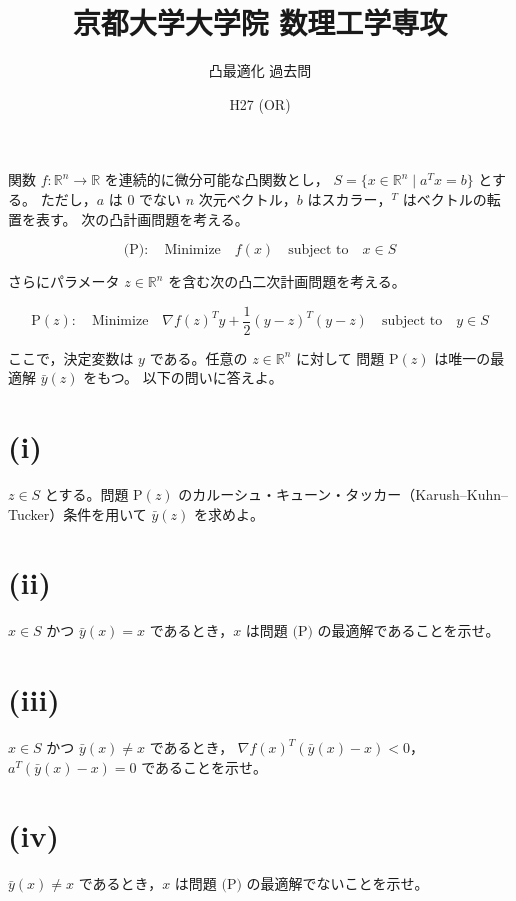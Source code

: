\documentclass[12pt,a4paper]{article}
\title{京都大学大学院 数理工学専攻}
\author{凸最適化 過去問}
\date{H27 (OR)}
\begin{document}
\maketitle

関数 $f:\mathbb{R}^n \to \mathbb{R}$ を連続的に微分可能な凸関数とし，
$S=\{x\in\mathbb{R}^n\mid a^T x=b\}$ とする。
ただし，$a$ は $0$ でない $n$ 次元ベクトル，$b$ はスカラー，$^T$ はベクトルの転置を表す。
次の凸計画問題を考える。

\[
\text{(P)}:\quad\text{Minimize}\quad f(x)\quad
\text{subject to}\quad x\in S
\]

さらにパラメータ $z\in\mathbb{R}^n$ を含む次の凸二次計画問題を考える。

\[
\text{P}(z):\quad\text{Minimize}\quad \nabla f(z)^T y + \frac{1}{2}(y-z)^T(y-z)\quad
\text{subject to}\quad y\in S
\]

ここで，決定変数は $y$ である。任意の $z\in\mathbb{R}^n$ に対して
問題 $\text{P}(z)$ は唯一の最適解 $\bar{y}(z)$ をもつ。
以下の問いに答えよ。

\section*{(i)}

$z\in S$ とする。問題 $\text{P}(z)$ のカルーシュ・キューン・タッカー（Karush--Kuhn--Tucker）条件を用いて
$\bar{y}(z)$ を求めよ。

\section*{(ii)}

$x\in S$ かつ $\bar{y}(x)=x$ であるとき，$x$ は問題 $\text{(P)}$ の最適解であることを示せ。

\section*{(iii)}

$x\in S$ かつ $\bar{y}(x)\neq x$ であるとき，
$\nabla f(x)^T(\bar{y}(x)-x) < 0$，
$a^T(\bar{y}(x)-x)=0$ であることを示せ。

\section*{(iv)}

$\bar{y}(x)\neq x$ であるとき，$x$ は問題 $\text{(P)}$ の最適解でないことを示せ。
\end{document}
